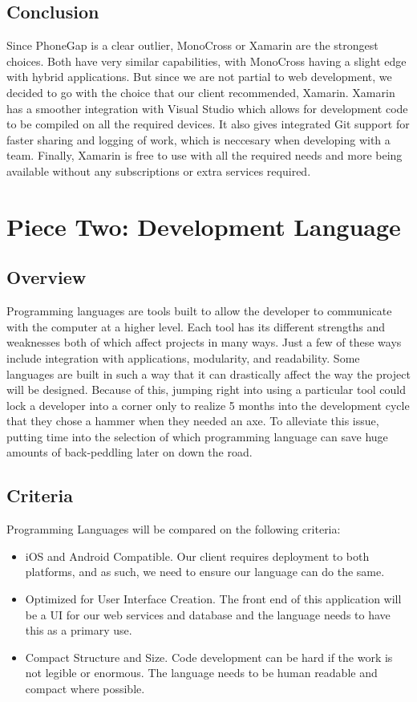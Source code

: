 \documentclass[onecolumn, draftclsnofoot,10pt, compsoc]{IEEEtran}
\begin{document}
\begin{singlespace}
\subsection{Conclusion}
Since PhoneGap is a clear outlier, MonoCross or Xamarin are the strongest choices. Both have very similar capabilities, with MonoCross having a slight edge with hybrid applications.
But since we are not partial to web development, we decided to go with the choice that our client recommended, Xamarin. Xamarin has a smoother integration with Visual Studio which 
allows for development code to be compiled on all the required devices. It also gives integrated Git support for faster sharing and logging of work,
which is neccesary when developing with a team. Finally, Xamarin is free to use with all the required needs and more being available without any subscriptions or extra services required. 


\section{Piece Two: Development Language}
\subsection{Overview}

Programming languages are tools built to allow the developer to communicate with the computer at a higher level. Each tool has its different strengths and weaknesses both of
which affect projects in many ways. Just a few of these ways include integration with applications, modularity, and readability. Some languages are built in such a way that it 
can drastically affect the way the project will be designed. Because of this, jumping right into using a particular tool could lock a developer into a corner only to realize
5 months into the development cycle that they chose a hammer when they needed an axe. To alleviate this issue, putting time into the selection of which programming language can save
huge amounts of back-peddling later on down the road.

\subsection{Criteria}
Programming Languages will be compared on the following criteria:
\begin{itemize}
	\item iOS and Android Compatible. Our client requires deployment to both platforms, and as such, we need to ensure our language can do the same.
	\item Optimized for User Interface Creation. The front end of this application will be a UI for our web services and database and the language needs to  have this as a  primary  use.
	\item Compact Structure and Size. Code development can be hard if the work is not legible or enormous. The language needs to be human readable and compact where possible.
\end{itemize}


\end{singlespace}
\end{document}
